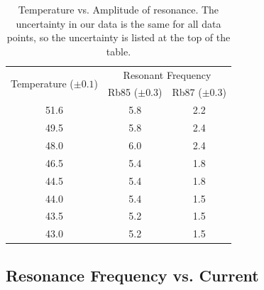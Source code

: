\documentclass[10pt]{article}
\begin{document}
	\begin{table}[h!]
		\centering
		\begin{tabular}{|c|cc|}
			\hline
			\multirow{2}{*}{Temperature (\( \pm 0.1 \))} 
			& \multicolumn{2}{c|}{Resonant Frequency} \\
			\cline{2-3} 
										 & \multicolumn{1}{c|}{Rb85 (\( \pm 0.3 \))} &
										 Rb87 (\( \pm 0.3 \)) \\ \hline
			51.6 & \multicolumn{1}{c|}{5.8} & 2.2 \\
			49.5 & \multicolumn{1}{c|}{5.8} & 2.4 \\
			48.0 & \multicolumn{1}{c|}{6.0} & 2.4 \\
			46.5 & \multicolumn{1}{c|}{5.4} & 1.8 \\
			44.5 & \multicolumn{1}{c|}{5.4} & 1.8 \\
			44.0 & \multicolumn{1}{c|}{5.4} & 1.5 \\
			43.5 & \multicolumn{1}{c|}{5.2} & 1.5 \\
			43.0 & \multicolumn{1}{c|}{5.2} & 1.5 \\ \hline
		\end{tabular}
		\caption{Temperature vs. Amplitude of resonance. The uncertainty in our data
			is the same for all data points, so the uncertainty is listed at the top of
		the table.   }
		\label{bulb-temperature}
	\end{table} 

	\pagebreak
	\subsection{Resonance Frequency vs. Current}
\end{document}
